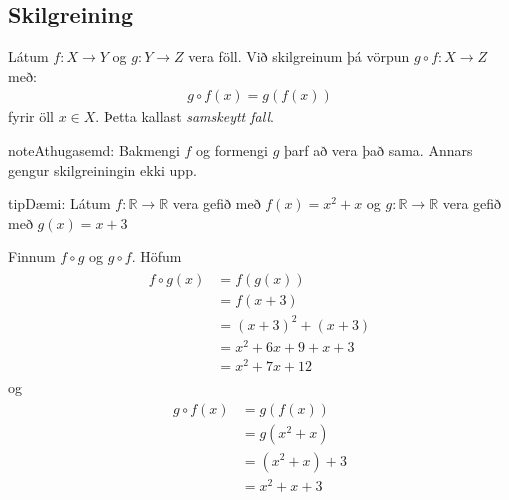 \documentclass[a4paper,10pt,icelandic]{sphinxmanual}
\begin{document}
\subsection{Skilgreining}
\label{\detokenize{Kafli09:id3}}
Látum \(f: X \to Y\) og \(g: Y \to Z\) vera föll. Við skilgreinum þá vörpun \(g \circ f: X \to Z\) með:
\begin{equation*}
\begin{split}g \circ f(x)=g(f(x))\end{split}
\end{equation*}
fyrir öll \(x \in X\). Þetta kallast \textit{samskeytt fall}.


\begin{sphinxadmonition}{note}{Athugasemd:}
Bakmengi \(f\) og formengi \(g\) þarf að vera það sama. Annars gengur skilgreiningin ekki upp.
\end{sphinxadmonition}

\begin{sphinxadmonition}{tip}{Dæmi:}
Látum \(f:\mathbb{R} \to \mathbb{R}\) vera gefið með \(f(x)=x^2+x\)
og \(g:\mathbb{R} \to \mathbb{R}\) vera gefið með \(g(x)=x+3\)

Finnum \(f\circ g\) og \(g\circ f\). Höfum
\begin{equation*}
\begin{split}\begin{aligned}
f\circ g(x) &=f(g(x))\\
&=f(x+3)\\
&=(x+3)^2+(x+3)\\
&=x^2+6x+9+x+3\\
&=x^2+7x+12
\end{aligned}\end{split}
\end{equation*}
og
\begin{equation*}
\begin{split}\begin{aligned}
g\circ f(x)&=g(f(x))\\
&=g(x^2+x)\\
&=(x^2+x)+3\\
&=x^2+x+3
\end{aligned}\end{split}
\end{equation*}\end{sphinxadmonition}
\end{document}
